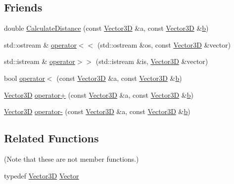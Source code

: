 \subsection*{Friends}
\begin{DoxyCompactItemize}
\item 
double \hyperlink{classns3_1_1Vector3D_a0d454b609d1dd69a7d1104056b88f1f3}{Calculate\+Distance} (const \hyperlink{classns3_1_1Vector3D}{Vector3D} \&a, const \hyperlink{classns3_1_1Vector3D}{Vector3D} \&\hyperlink{lte__pathloss_8m_a21ad0bd836b90d08f4cf640b4c298e7c}{b})
\item 
std\+::ostream \& \hyperlink{classns3_1_1Vector3D_a40a724f1e5055492d9671a3c7837559f}{operator$<$$<$} (std\+::ostream \&os, const \hyperlink{classns3_1_1Vector3D}{Vector3D} \&vector)
\item 
std\+::istream \& \hyperlink{classns3_1_1Vector3D_a6603a58c4077919a177fa90b2d3ee2a3}{operator$>$$>$} (std\+::istream \&is, \hyperlink{classns3_1_1Vector3D}{Vector3D} \&vector)
\item 
bool \hyperlink{classns3_1_1Vector3D_af2899258858cfcb9f9044dd71e46c5f4}{operator$<$} (const \hyperlink{classns3_1_1Vector3D}{Vector3D} \&a, const \hyperlink{classns3_1_1Vector3D}{Vector3D} \&\hyperlink{lte__pathloss_8m_a21ad0bd836b90d08f4cf640b4c298e7c}{b})
\item 
\hyperlink{classns3_1_1Vector3D}{Vector3D} \hyperlink{classns3_1_1Vector3D_a39bfe21a2d1ab6984ded35b5355b202e}{operator+} (const \hyperlink{classns3_1_1Vector3D}{Vector3D} \&a, const \hyperlink{classns3_1_1Vector3D}{Vector3D} \&\hyperlink{lte__pathloss_8m_a21ad0bd836b90d08f4cf640b4c298e7c}{b})
\item 
\hyperlink{classns3_1_1Vector3D}{Vector3D} \hyperlink{classns3_1_1Vector3D_a7ee82807781e470db564c4db6e9de245}{operator-\/} (const \hyperlink{classns3_1_1Vector3D}{Vector3D} \&a, const \hyperlink{classns3_1_1Vector3D}{Vector3D} \&\hyperlink{lte__pathloss_8m_a21ad0bd836b90d08f4cf640b4c298e7c}{b})
\end{DoxyCompactItemize}
\subsection*{Related Functions}
(Note that these are not member functions.) \begin{DoxyCompactItemize}
\item 
typedef \hyperlink{classns3_1_1Vector3D}{Vector3D} \hyperlink{classns3_1_1Vector3D_a7e59b47bc94c9cb1dadff68c1d0112d8}{Vector}
\end{DoxyCompactItemize}


